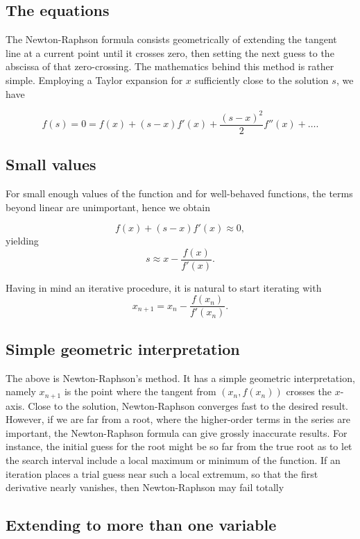 \documentclass[%
oneside,                 %
final,                   %
10pt]{article}
\begin{document}
\subsection*{The equations}

The Newton-Raphson formula consists geometrically of extending the
tangent line at a current point until it crosses zero, then setting
the next guess to the abscissa of that zero-crossing.  The mathematics
behind this method is rather simple. Employing a Taylor expansion for
$x$ sufficiently close to the solution $s$, we have

\[
    f(s)=0=f(x)+(s-x)f'(x)+\frac{(s-x)^2}{2}f''(x) +\dots.
    \label{eq:taylornr}
\]

\subsection*{Small values}

For small enough values of the function and for well-behaved
functions, the terms beyond linear are unimportant, hence we obtain

\[
   f(x)+(s-x)f'(x)\approx 0,
\]
yielding
\[
   s\approx x-\frac{f(x)}{f'(x)}.
\]

Having in mind an iterative procedure, it is natural to start iterating with
\[
   x_{n+1}=x_n-\frac{f(x_n)}{f'(x_n)}.
\]

\subsection*{Simple geometric interpretation}

The above is Newton-Raphson's method. It has a simple geometric
interpretation, namely $x_{n+1}$ is the point where the tangent from
$(x_n,f(x_n))$ crosses the $x$-axis.  Close to the solution,
Newton-Raphson converges fast to the desired result. However, if we
are far from a root, where the higher-order terms in the series are
important, the Newton-Raphson formula can give grossly inaccurate
results. For instance, the initial guess for the root might be so far
from the true root as to let the search interval include a local
maximum or minimum of the function.  If an iteration places a trial
guess near such a local extremum, so that the first derivative nearly
vanishes, then Newton-Raphson may fail totally

\subsection*{Extending to more than one variable}
\end{document}

